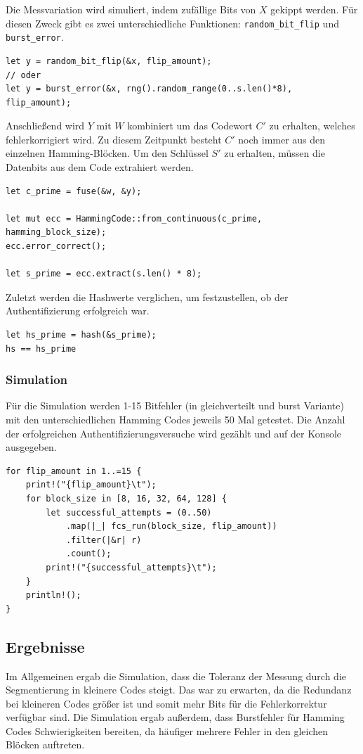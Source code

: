 \documentclass{article}
\begin{document}
    Die Messvariation wird simuliert, indem zufällige Bits von $X$ gekippt werden. Für diesen Zweck gibt es zwei unterschiedliche
    Funktionen: \verb|random_bit_flip| und \verb|burst_error|.
    \begin{verbatim}
let y = random_bit_flip(&x, flip_amount);
// oder
let y = burst_error(&x, rng().random_range(0..s.len()*8), flip_amount);
    \end{verbatim}
    Anschließend wird $Y$ mit $W$ kombiniert um das Codewort $C'$ zu erhalten, welches fehlerkorrigiert wird. Zu diesem Zeitpunkt
    besteht $C'$ noch immer aus den einzelnen Hamming-Blöcken. Um den Schlüssel $S'$ zu erhalten, müssen die Datenbits aus dem
    Code extrahiert werden.
    \begin{verbatim}
let c_prime = fuse(&w, &y);

let mut ecc = HammingCode::from_continuous(c_prime, hamming_block_size);
ecc.error_correct();

let s_prime = ecc.extract(s.len() * 8);
    \end{verbatim}
    Zuletzt werden die Hashwerte verglichen, um festzustellen, ob der Authentifizierung erfolgreich war.
    \begin{verbatim}
let hs_prime = hash(&s_prime);
hs == hs_prime
    \end{verbatim}
    \subsubsection{Simulation}
    Für die Simulation werden 1-15 Bitfehler (in gleichverteilt und burst Variante) mit den unterschiedlichen
    Hamming Codes jeweils 50 Mal getestet. Die Anzahl der erfolgreichen Authentifizierungsversuche wird gezählt und auf
    der Konsole ausgegeben.
    \begin{verbatim}
for flip_amount in 1..=15 {
    print!("{flip_amount}\t");
    for block_size in [8, 16, 32, 64, 128] {
        let successful_attempts = (0..50)
            .map(|_| fcs_run(block_size, flip_amount))
            .filter(|&r| r)
            .count();
        print!("{successful_attempts}\t");
    }
    println!();
}
    \end{verbatim}
    \subsection{Ergebnisse}
    Im Allgemeinen ergab die Simulation, dass die Toleranz der Messung durch die Segmentierung in kleinere Codes
    steigt. Das war zu erwarten, da die Redundanz bei kleineren Codes größer ist und somit mehr Bits für die
    Fehlerkorrektur verfügbar sind. Die Simulation ergab außerdem, dass Burstfehler für Hamming Codes Schwierigkeiten
    bereiten, da häufiger mehrere Fehler in den gleichen Blöcken auftreten.
\end{document}
